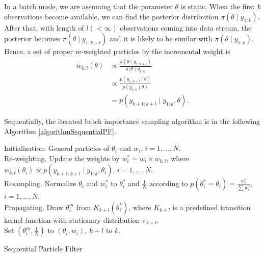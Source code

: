 In a batch mode, we are assuming that the parameter $\theta$ is static. When the first $k$ observations become available, we can find the posterior distribution $\pi(\theta\mid y_{1:k})$. After that, with length of $l (<\infty)$ observations coming into data stream, the posterior becomes $\pi(\theta\mid y_{1:k+l})$ and it is likely to be similar with $\pi(\theta\mid y_{1:k})$.  Hence, a set of proper re-weighted particles by the incremental weight is 
\begin{align*}
w_{k,l}(\theta) &\propto \frac{\pi(\theta\mid y_{1:k+l}) }{\pi(\theta\mid y_{1:k}} \\
&\propto \frac{p(y_{1:k+l}\mid \theta) }{p(y_{1:k}\mid\theta)} \\
&=p(y_{k+1:k+l}\mid y_{1:k},\theta). 
\end{align*}

Sequentially, the iterated batch importance sampling algorithm is in the following Algorithm \ref{algorithmSequentialPF}. 
\begin{algorithm}[h]
\SetAlgoLined 
Initialization:  General particles of $\theta_i$ and $w_i$, $i=1,\ldots,N$.\\
 {Re-weighting. Update the weights by $w_i^*=w_i \times w_{k,l}$, where $w_{k,l}(\theta_i)\propto p(y_{k+1:k+l}\mid y_{1:k},\theta_i)$, $i=1,\ldots,N$. \\
Resampling. Normalize $\theta_i$ and $w^*_i$ to $\theta_i^*$ and $\frac{1}{N}$ according to $p(\theta_i^*=\theta_i)=\frac{w_i^*}{\sum w_i^*}$,  $i=1,\ldots,N$. \\
Propagating. Draw $\theta_i^m$ from $K_{k+l}(\theta_i^*)$, where $K_{k+l}$ is a predefined transition kernel function with stationary distribution $\pi_{k+l}$.\\
Set $(\theta_i^m,\frac{1}{N})$ to $(\theta_i,w_i)$, $k+l$ to $k$.}
 \caption{Sequential Particle Filter}\label{algorithmSequentialPF}
\end{algorithm}

